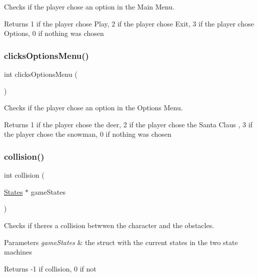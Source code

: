 Checks if the player chose an option in the Main Menu. 

\begin{DoxyReturn}{Returns}
1 if the player chose Play, 2 if the player chose Exit, 3 if the player chose Options, 0 if nothing was chosen 
\end{DoxyReturn}
\mbox{\label{group___graphics_gad55a59d3fd603520980e4794f29e83bd}} 
\subsubsection{\texorpdfstring{clicks\+Options\+Menu()}{clicksOptionsMenu()}}
{\footnotesize\ttfamily int clicks\+Options\+Menu (\begin{DoxyParamCaption}{ }\end{DoxyParamCaption})}



Checks if the player chose an option in the Options Menu. 

\begin{DoxyReturn}{Returns}
1 if the player chose the deer, 2 if the player chose the Santa Claus , 3 if the player chose the snowman, 0 if nothing was chosen 
\end{DoxyReturn}
\mbox{\label{group___graphics_ga9c0ab323b39cd0254dbfdaa80dcac495}} 
\subsubsection{\texorpdfstring{collision()}{collision()}}
{\footnotesize\ttfamily int collision (\begin{DoxyParamCaption}\item[{\hyperlink{struct_states}{States} $\ast$}]{game\+States }\end{DoxyParamCaption})}



Checks if there\textquotesingle{}s a collision betwwen the character and the obstacles. 


\begin{DoxyParams}{Parameters}
{\em game\+States} & the struct with the current states in the two state machines \\
\hline
\end{DoxyParams}
\begin{DoxyReturn}{Returns}
-\/1 if collision, 0 if not 
\end{DoxyReturn}
\mbox{\label{group___graphics_ga84e0c347e163833410a8df9d914402fa}} 
